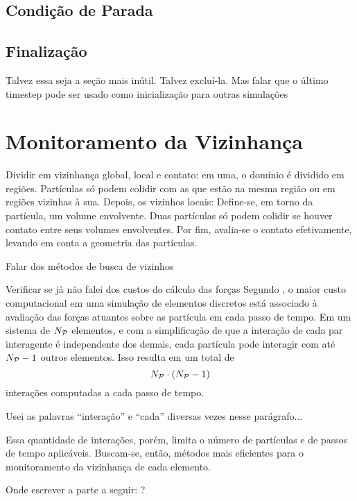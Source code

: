 \subsection{Condição de Parada}

\subsection{Finalização}\alert{Talvez essa seja a seção mais inútil. Talvez excluí-la. Mas falar que o último timestep pode ser usado como inicialização para outras simulações}

\section{Monitoramento da Vizinhança} \label{sec:neighborhood}
\alert{Dividir em vizinhança global, local e contato: em uma, o domínio é dividido em regiões. Partículas só podem colidir com as que estão na mesma região ou em regiões vizinhas à sua. Depois, os vizinhos locais: Define-se, em torno da partícula, um volume envolvente. Duas partículas só podem colidir se houver contato entre seus volumes envolventes. Por fim, avalia-se o contato efetivamente, levando em conta a geometria das partículas.}

\alert{Falar dos métodos de busca de vizinhos}

\alert{Verificar se já não falei dos custos do cálculo das forças} Segundo , o maior custo computacional em uma simulação de elementos discretos está associado à avaliação das forças atuantes sobre as partícula em cada passo de tempo. Em um sistema de \(N_{\mathcal{P}}\) elementos, e com a simplificação de que a interação de cada par interagente é independente dos demais, cada partícula pode interagir com até \(N_{\mathcal{P}}-1\) outros elementos. Isso resulta em um total de
\begin{equation*}
	\numberOfParticles\cdot\pqty{\numberOfParticles-1}
\end{equation*}
interações computadas a cada passo de tempo.

\alert{Usei as palavras ``interação'' e ``cada'' diversas vezes nesse parágrafo...}

Essa quantidade de interações, porém, limita o número de partículas e de passos de tempo aplicáveis. Buscam-se, então, métodos mais eficientes para o monitoramento da vizinhança de cada elemento. 

\alert{Onde escrever a parte a seguir: ?}

